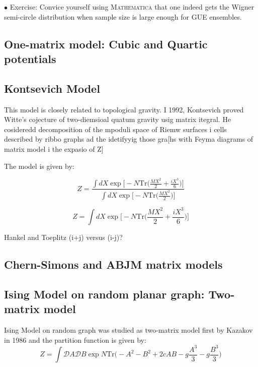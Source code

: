 \documentclass[11pt]{article}
\newcommand{\MA}{\textsc{Mathematica }}
\begin{document}
\begin{mdframed}[backgroundcolor=blue!3] 
	\textsc{} 
	$\bullet$ Exercise: Convice yourself using \MA that one indeed gets the Wigner semi-circle distribution when sample size is large enough for GUE ensembles. 
\end{mdframed} 

\subsection{One-matrix model: Cubic and Quartic potentials}

\subsection{Kontsevich Model}

This model is closely related to topological gravity. I 1992, 
Kontsevich proved Witte's cojecture of two-diemsioal quatum gravity 
usig matrix itegral. He cosideredd decomposition of the mpoduli space of Riemw surfaces i cells described by ribbo graphs ad the idetifyyig those gra[hs with Feyma diagrams of matrix model i the expasio of Z]

The model is given by:

\begin{equation}
	Z = \frac{\int dX \exp \Big[ -N \mbox{Tr} \Big( \frac{MX^2}{2} + \frac{iX^3}{6}\Big)\Big] }{{\int dX \exp \Big[ -N \mbox{Tr} \Big(\frac{MX^2}{2}\Big) \Big]}}
\end{equation}

\begin{equation}
	Z = \int dX \exp \Big[ -N \mbox{Tr} \Big( \frac{MX^2}{2} + \frac{iX^3}{6}\Big)\Big]
\end{equation}



Hankel and Toeplitz (i+j) versus (i-j)?


% 

\subsection{Chern-Simons and ABJM matrix models}

\subsection{Ising Model on random planar graph: Two-matrix model}

Ising Model on random graph was studied as two-matrix model first by Kazakov in 1986 and the partition function is given by:
\begin{equation}
	\label{eq:Kaz1} 
	Z = \int \mathcal{D}A \mathcal{D}B \exp N \mbox{Tr} \Bigg(-A^2 -B^2 + 2c AB -g \frac{A^3}{3} - g\frac{B^3}{3}  \Bigg)
\end{equation}
\end{document}
